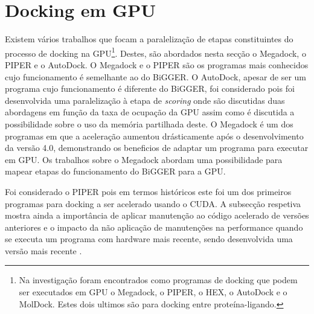
\section{Docking em GPU}
\label{gpus1}
Existem vários trabalhos que focam a paralelização de etapas constituintes do processo de docking na GPU\footnote[5]{Na investigação foram encontrados como programas de docking que podem ser executados em GPU o Megadock, o PIPER, o HEX, o AutoDock e o MolDock. Estes dois ultimos são para docking entre proteína-ligando.}. Destes, são abordados nesta secção o Megadock, o PIPER e o AutoDock. O Megadock e o PIPER são os programas mais conhecidos cujo funcionamento é semelhante ao do BiGGER. O AutoDock, apesar de ser um programa cujo funcionamento é diferente do BiGGER, foi considerado pois foi desenvolvida uma paralelização à etapa de \textit{scoring} \cite{autodockCuda} onde são discutidas duas abordagens em função da taxa de ocupação da GPU assim como é discutida a possibilidade sobre o uso da memória partilhada deste. O Megadock é um dos programas em que a aceleração aumentou drásticamente após o desenvolvimento da versão 4.0, demonstrando os beneficios de adaptar um programa para executar em GPU. Os trabalhos sobre o Megadock \cite{shimoda2015protein} \cite{megadock40} abordam uma possibilidade para mapear etapas do funcionamento do BiGGER para a GPU.\par Foi considerado o PIPER pois em termos históricos este foi um dos primeiros programas para docking a ser acelerado usando o CUDA\cite{piper2009gpu}. A subsecção respetiva mostra ainda a importância de aplicar manutenção ao código acelerado de versões anteriores e o impacto da não aplicação de manutenções na performance quando se executa um programa com hardware mais recente, sendo desenvolvida uma versão mais recente \cite{piper2014gpu}.

